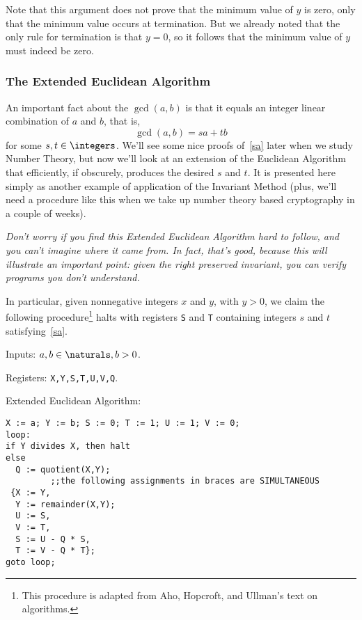Note that this argument does not prove that the minimum value of $y$ is
zero, only that the minimum value occurs at termination.  But we already
noted that the only rule for termination is that $y=0$, so it follows that
the minimum value of $y$ must indeed be zero.

\begin{editingnotes}
\subsubsection{The Extended Euclidean Algorithm}\label{ExtendedGCD}

An important fact about the $\gcd(a,b)$ is that it equals an integer
linear combination of $a$ and $b$, that is,
\begin{equation}\label{sa}
\gcd(a,b) = sa+ tb
\end{equation}
for some $s,t \in \integers$.  We'll see some nice proofs
of~\eqref{sa} later when we study Number Theory, but now we'll look
at an extension of the Euclidean Algorithm that efficiently, if
obscurely, produces the desired $s$ and $t$.  It is presented here
simply as another example of application of the Invariant Method
(plus, we'll need a procedure like this when we take up number theory
based cryptography in a couple of weeks).

\emph{Don't worry if you find this Extended Euclidean Algorithm hard to
  follow, and you can't imagine where it came from.  In fact, that's good,
  because this will illustrate an important point: given the right
  preserved invariant, you can verify programs you don't understand.}

In particular, given nonnegative integers $x$ and $y$, with $y>0$, we
claim the following procedure\footnote{This procedure is adapted from Aho,
  Hopcroft, and Ullman's text on algorithms.}  halts with registers
\texttt{S} and \texttt{T} containing integers $s$ and $t$
satisfying~\eqref{sa}.

Inputs: $a,b \in \naturals, b>0$.

Registers: \texttt{X,Y,S,T,U,V,Q}.

Extended Euclidean Algorithm:
\begin{center}
\begin{verbatim}
X := a; Y := b; S := 0; T := 1; U := 1; V := 0; 
loop:
if Y divides X, then halt
else
  Q := quotient(X,Y);
         ;;the following assignments in braces are SIMULTANEOUS
 {X := Y,
  Y := remainder(X,Y);
  U := S,
  V := T,
  S := U - Q * S,
  T := V - Q * T};
goto loop;
\end{verbatim}
\end{center}


\end{editingnotes}
